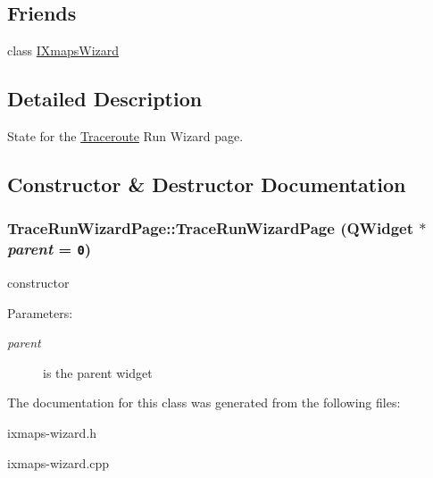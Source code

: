 \subsection*{Friends}
\begin{CompactItemize}
\item 
\hypertarget{classTraceRunWizardPage_d62a26a0af746c34a19cd066f6dabd22}{
class \hyperlink{classTraceRunWizardPage_d62a26a0af746c34a19cd066f6dabd22}{IXmapsWizard}}
\label{classTraceRunWizardPage_d62a26a0af746c34a19cd066f6dabd22}

\end{CompactItemize}


\subsection{Detailed Description}
State for the \hyperlink{classTraceroute}{Traceroute} Run Wizard page. 

\subsection{Constructor \& Destructor Documentation}
\hypertarget{classTraceRunWizardPage_f800e04662636ac441ef3446e4251fb9}{
\subsubsection[TraceRunWizardPage]{\setlength{\rightskip}{0pt plus 5cm}TraceRunWizardPage::TraceRunWizardPage (QWidget $\ast$ {\em parent} = {\tt 0})}}
\label{classTraceRunWizardPage_f800e04662636ac441ef3446e4251fb9}


constructor \begin{Desc}
\item[Parameters:]
\begin{description}
\item[{\em parent}]is the parent widget \end{description}
\end{Desc}


The documentation for this class was generated from the following files:\begin{CompactItemize}
\item 
ixmaps-wizard.h\item 
ixmaps-wizard.cpp\end{CompactItemize}
